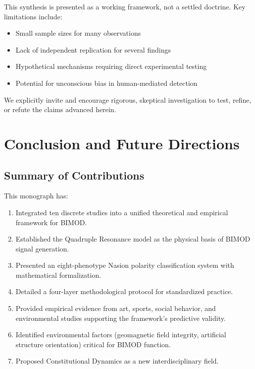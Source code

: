 \documentclass[12pt,a4paper]{article}
\begin{document}
This synthesis is presented as a working framework, not a settled doctrine. Key limitations include:

\begin{itemize}
    \item Small sample sizes for many observations
    \item Lack of independent replication for several findings
    \item Hypothetical mechanisms requiring direct experimental testing
    \item Potential for unconscious bias in human-mediated detection
\end{itemize}

We explicitly invite and encourage rigorous, skeptical investigation to test, refine, or refute the claims advanced herein.

\section{Conclusion and Future Directions}

\subsection{Summary of Contributions}

This monograph has:

\begin{enumerate}
    \item Integrated ten discrete studies into a unified theoretical and empirical framework for BIMOD.
    \item Established the Quadruple Resonance model as the physical basis of BIMOD signal generation.
    \item Presented an eight-phenotype Nasion polarity classification system with mathematical formalization.
    \item Detailed a four-layer methodological protocol for standardized practice.
    \item Provided empirical evidence from art, sports, social behavior, and environmental studies supporting the framework's predictive validity.
    \item Identified environmental factors (geomagnetic field integrity, artificial structure orientation) critical for BIMOD function.
    \item Proposed Constitutional Dynamics as a new interdisciplinary field.
\end{enumerate}
\end{document}
